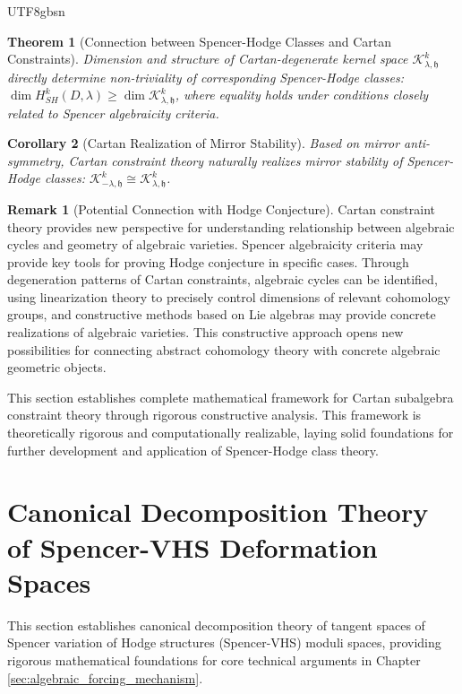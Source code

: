 \documentclass[a4paper,12pt]{extarticle}
\newtheorem{theorem}{Theorem}[section]
\newtheorem{corollary}[theorem]{Corollary}
\theoremstyle{definition}
\newtheorem{remark}{Remark}[section]
\begin{document}
\begin{CJK}{UTF8}{gbsn}
\begin{theorem}[Connection between Spencer-Hodge Classes and Cartan Constraints]
\label{thm:spencer_hodge_cartan_connection}
Dimension and structure of Cartan-degenerate kernel space $\mathcal{K}^k_{\lambda,\mathfrak{h}}$ directly determine non-triviality of corresponding Spencer-Hodge classes: $\dim H^k_{SH}(D,\lambda) \geq \dim \mathcal{K}^k_{\lambda,\mathfrak{h}}$, where equality holds under conditions closely related to Spencer algebraicity criteria.
\end{theorem}

\begin{corollary}[Cartan Realization of Mirror Stability]
\label{cor:mirror_stability_cartan}
Based on mirror anti-symmetry, Cartan constraint theory naturally realizes mirror stability of Spencer-Hodge classes: $\mathcal{K}^k_{-\lambda,\mathfrak{h}} \cong \mathcal{K}^k_{\lambda,\mathfrak{h}}$.
\end{corollary}

\begin{remark}[Potential Connection with Hodge Conjecture]
\label{rem:hodge_conjecture_connection}
Cartan constraint theory provides new perspective for understanding relationship between algebraic cycles and geometry of algebraic varieties. Spencer algebraicity criteria may provide key tools for proving Hodge conjecture in specific cases. Through degeneration patterns of Cartan constraints, algebraic cycles can be identified, using linearization theory to precisely control dimensions of relevant cohomology groups, and constructive methods based on Lie algebras may provide concrete realizations of algebraic varieties. This constructive approach opens new possibilities for connecting abstract cohomology theory with concrete algebraic geometric objects.
\end{remark}

This section establishes complete mathematical framework for Cartan subalgebra constraint theory through rigorous constructive analysis. This framework is theoretically rigorous and computationally realizable, laying solid foundations for further development and application of Spencer-Hodge class theory.

\section{Canonical Decomposition Theory of Spencer-VHS Deformation Spaces}
\label{sec:spencer_vhs_decomposition}

This section establishes canonical decomposition theory of tangent spaces of Spencer variation of Hodge structures (Spencer-VHS) moduli spaces, providing rigorous mathematical foundations for core technical arguments in Chapter \ref{sec:algebraic_forcing_mechanism}.


\end{CJK}
\end{document}
